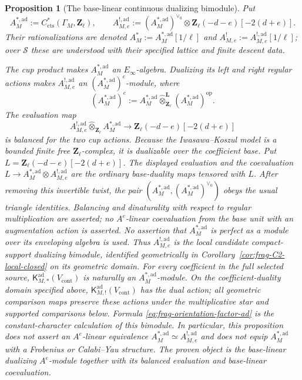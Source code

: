 \documentclass[11pt]{article}
\newtheorem{proposition}[theorem]{Proposition}
\theoremstyle{definition}
\theoremstyle{remark}
\begin{document}
\begin{proposition}[The base-linear continuous dualizing bimodule]
\label{prop:frag-continuous-dualizing-bimodule}
Put
\begin{equation}
 A^{*,\mathrm{ad}}_M:=
 C^*_{\mathrm{cts}}(\Gamma_M,\mathbf Z_\ell),
 \qquad
 A^{!,\mathrm{ad}}_{M,e}:=
 (A^{*,\mathrm{ad}}_M)^{\vee_0}
 \otimes\mathbf Z_\ell(-d-e)[-2(d+e)].
 \label{eq:frag-star-shriek-algebras}
\end{equation}
Their rationalizations are denoted
$A_M^*:=A_M^{*,\mathrm{ad}}[1/\ell]$ and
$A_{M,e}^!:=A_{M,e}^{!,\mathrm{ad}}[1/\ell]$; over $\mathscr S$ these are
understood with their specified lattice and finite descent data.

The cup product makes $A^{*,\mathrm{ad}}_M$ an $E_\infty$-algebra.
Dualizing its left and right regular actions makes
$A^{!,\mathrm{ad}}_{M,e}$ an
$(A^{*,\mathrm{ad}}_M)^e$-module, where
\[
 (A^{*,\mathrm{ad}}_M)^e:=
 A^{*,\mathrm{ad}}_M
 \widehat\otimes^{\mathbf L}_{\mathbf Z_\ell}
 (A^{*,\mathrm{ad}}_M)^{\mathrm{op}}.
\]
The evaluation map
\begin{equation}
 A^{!,\mathrm{ad}}_{M,e}
 \widehat\otimes_{\mathbf Z_\ell}
 A^{*,\mathrm{ad}}_M
 \longrightarrow \mathbf Z_\ell(-d-e)[-2(d+e)]
 \label{eq:frag-balanced-dualizing-evaluation}
\end{equation}
is balanced for the two cup actions.  Because the Iwasawa--Koszul model is a
bounded finite free $\mathbf Z_\ell$-complex, it is dualizable over the
coefficient base.  Put $L=\mathbf Z_\ell(-d-e)[-2(d+e)]$.
The displayed evaluation and the coevaluation
$L\to A^{*,\mathrm{ad}}_M\widehat\otimes A^{!,\mathrm{ad}}_{M,e}$
are the ordinary base-duality maps tensored with $L$.
After removing this invertible twist, the pair
$(A^{*,\mathrm{ad}}_M,(A^{*,\mathrm{ad}}_M)^{\vee_0})$ obeys the
usual triangle identities.  Balancing and dinaturality with respect
to regular multiplication are asserted; no $A^e$-linear coevaluation
from the base unit with an augmentation action is asserted.  No assertion
that $A^{*,\mathrm{ad}}_M$ is perfect as a module over its enveloping algebra
is used.  Thus
$A^{!,\mathrm{ad}}_{M,e}$ is the local
candidate compact-support dualizing bimodule, identified geometrically
in Corollary~\ref{cor:frag-C2-local-closed} on its geometric domain.
For every coefficient in the full selected source,
$\mathsf K^{\mathrm{ad}}_{M,*}(V_{\mathrm{cont}})$ is naturally an
$A^{*,\mathrm{ad}}_M$-module.  On the coefficient-duality domain
specified above, $\mathsf K^{\mathrm{ad}}_{M,!}(V_{\mathrm{cont}})$
has the dual action; all
geometric comparison maps preserve these actions under the
multiplicative star and supported comparisons below.  Formula
\eqref{eq:frag-orientation-factor-ad} is the constant-character calculation
of this bimodule.
In particular, this proposition does not assert an $A^e$-linear equivalence
$A^{*,\mathrm{ad}}_M\simeq A^{!,\mathrm{ad}}_{M,e}$ and does not equip
$A^{*,\mathrm{ad}}_M$ with a Frobenius or Calabi--Yau structure.  The proven
object is the base-linear dualizing $A^e$-module together with its balanced
evaluation and base-linear coevaluation.
\end{proposition}
\end{document}
